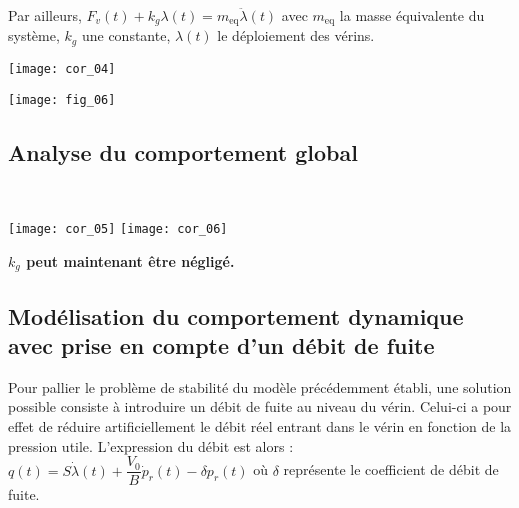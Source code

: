 Par ailleurs, $F_v(t)+k_g \lambda(t)=m_{\text{eq}}\ddot{\lambda}(t)$ avec $m_{\text{eq}}$ la masse équivalente du système, $k_g$ une constante, $\lambda(t)$ le déploiement des vérins.
\fi


\ifprof
\begin{corrige}
\begin{center}
\texttt{[image: cor\_04]}
\end{center}    
\end{corrige}
\else
\fi
\begin{center}
\texttt{[image: fig\_06]}
\end{center}


\ifprof
\else
\subsection*{Analyse du comportement global}
\fi


\ifprof
\begin{corrige} ~\\
\begin{center}
\texttt{[image: cor\_05]}
\texttt{[image: cor\_06]}
\end{center}
\end{corrige}
\else
\fi


\ifprof
\else

\textbf{$k_g$ peut maintenant être négligé.}

\subsection*{Modélisation du comportement dynamique avec prise en compte d'un débit de fuite}
Pour pallier le problème de stabilité du modèle précédemment établi, une solution possible consiste à introduire un débit de fuite au niveau du vérin. Celui-ci a pour effet de réduire artificiellement le débit réel entrant dans le vérin en fonction de la pression utile. L'expression du débit est alors : 
$q(t)=S\dot{\lambda}(t)+\dfrac{V_0}{B} \dot{p}_r(t)-\delta p_r(t)$ où $\delta$ représente le coefficient de débit de fuite.
\fi


